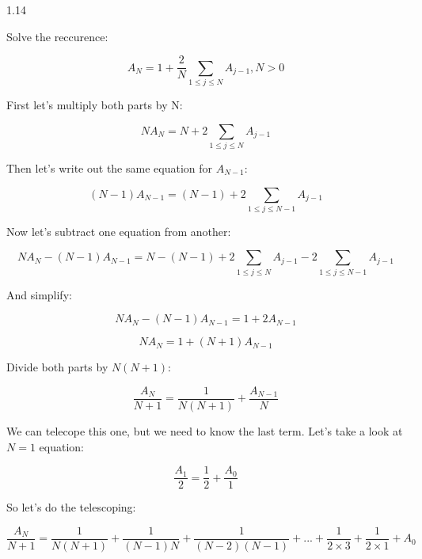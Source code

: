 \documentclass[12pt]{article}
\begin{document}
1.14

Solve the reccurence:

\begin{equation}
A_{N} = 1 + \frac{2}{N}\sum_{1\leq j \leq N}A_{j-1}, N > 0 \nonumber
\end{equation}

First let's multiply both parts by N:

\begin{equation}
NA_{N} = N + 2\sum_{1 \leq j \leq N}A_{j-1} \nonumber
\end{equation}

Then let's write out the same equation for ${A_{N-1}}$:

\begin{equation}
(N-1)A_{N-1} = (N - 1) + 2\sum_{1 \leq j \leq N-1}A_{j-1} \nonumber
\end{equation}

Now let's subtract one equation from another:

\begin{equation}
NA_{N} - (N-1)A_{N-1} = N - (N-1) + 2\sum_{1 \leq j \leq N}A_{j-1} - 2\sum_{1 \leq j \leq N-1}A_{j-1} \nonumber
\end{equation}

And simplify:

\begin{equation}
NA_{N} - (N-1)A_{N-1} = 1 + 2A_{N-1} \nonumber
\end{equation}

\begin{equation}
NA_{N} = 1 + (N+1)A_{N-1} \nonumber
\end{equation}

Divide both parts by ${N(N+1)}$:

\begin{equation}
\frac{A_{N}}{N+1} = \frac{1}{N(N+1)} + \frac{A_{N-1}}{N} \nonumber
\end{equation}

We can telecope this one, but we need to know the last term. Let's take a look at ${N=1}$ equation:

\begin{equation}
\frac{A_{1}}{2} = \frac{1}{2} + \frac{A_{0}}{1} \nonumber
\end{equation}

So let's do the telescoping:

\begin{equation}
\frac{A_{N}}{N+1} = \frac{1}{N(N+1)} + \frac{1}{(N-1)N} + \frac{1}{(N-2)(N-1)} + ... + \frac{1}{2 \times 3} + \frac{1}{2 \times 1} + A_{0} \nonumber
\end{equation}
\end{document}
